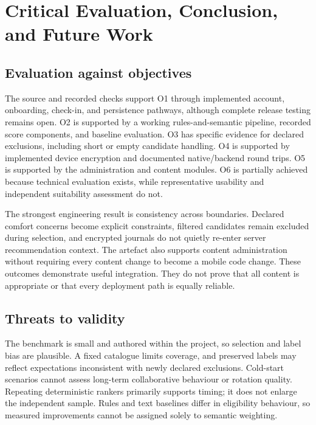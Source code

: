 \section{Critical Evaluation, Conclusion, and Future Work}\label{sec:chapter-8}

\subsection{Evaluation against objectives}

The source and recorded checks support O1 through implemented account, onboarding, check-in, and persistence pathways, although complete release testing remains open. O2 is supported by a working rules-and-semantic pipeline, recorded score components, and baseline evaluation. O3 has specific evidence for declared exclusions, including short or empty candidate handling. O4 is supported by implemented device encryption and documented native/\allowbreak{}backend round trips. O5 is supported by the administration and content modules. O6 is partially achieved because technical evaluation exists, while representative usability and independent suitability assessment do not.

The strongest engineering result is consistency across boundaries. Declared comfort concerns become explicit constraints, filtered candidates remain excluded during selection, and encrypted journals do not quietly re-enter server recommendation context. The artefact also supports content administration without requiring every content change to become a mobile code change. These outcomes demonstrate useful integration. They do not prove that all content is appropriate or that every deployment path is equally reliable.

\subsection{Threats to validity}

The benchmark is small and authored within the project, so selection and label bias are plausible. A fixed catalogue limits coverage, and preserved labels may reflect expectations inconsistent with newly declared exclusions. Cold-start scenarios cannot assess long-term collaborative behaviour or rotation quality. Repeating deterministic rankers primarily supports timing; it does not enlarge the independent sample. Rules and text baselines differ in eligibility behaviour, so measured improvements cannot be assigned solely to semantic weighting.

